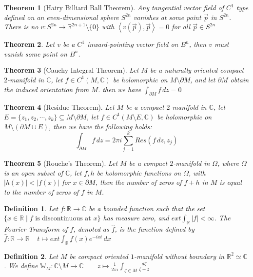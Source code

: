 \documentclass[9pt]{article}
\theoremstyle{break}
\theoremstyle{break}
\newtheorem{thm}{Theorem}[section]
\newtheorem{defn}{Definition}[corL]
\newcommand{\R}{\mathbb{R}}
\newcommand{\Complex}{\mathbb{C}}
\begin{document}
\begin{thm}[Hairy Billiard Ball Theorem]
Any tangential vector field of $C^1$ type defined on an even-dimensional sphere $S^{2n}$ vanishes at some point $\vec{p}$ in $S^{2n}$. There is no $v:S^{2n} \to \R^{2n+1}\setminus \{0\}$ with $\left<v(\vec{p}), \vec{p}\right> = 0$ for all $\vec{p}\in S^{2n}$
\end{thm}

\begin{thm}
Let $v$ be a $C^1$ inward-pointing vector field on $B^n$, then $v$ must vanish some point on $B^n$.
\end{thm}

\begin{thm}[Cauchy Integral Theorem]
Let $M$ be a naturally oriented compact $2$-manifold in $\Complex$, let $f \in C^1(M, \Complex)$ be holomorphic on $M \setminus \partial M$, and let $\partial M$ obtain the induced orientation from $M$. then we have $\int_{\partial M}f\, dz = 0$
\end{thm}


\begin{thm}[Residue Theorem]
Let $M$ be a compact $2$-manifold in $\Complex$, let $E = \{z_1,z_2,\cdots, z_k\} \subseteq M\setminus \partial M$, let $f\in C^1(M\setminus E, \Complex)$ be holomorphic on $M \setminus (\partial M\cup E)$, then we have the following holds:
$$\int_{\partial M}f\, dz = 2\pi i \sum_{j=1}^k Res(f\, dz, z_j)$$ 
\end{thm}


\begin{thm}[Rouche's Theorem]
Let $M$ be a compact $2$-manifold in $\Omega$, where $\Omega$ is an open subset of $\Complex$, let $f, h$ be holomorphic functions on $\Omega$, with $|h(x)|< |f(x)|$ for $x\in\partial M$, then the number of zeros of $f+h$ in $M$ is equal to the number of zeros of $f$ in $M$.  
\end{thm}

\begin{defn}
Let $f:\R \to \Complex$ be a bounded function such that the set $\{x \in \R \mid f\text{ is discontinuous at }x\}$ has measure zero, and $ext \int_{\R}|f| < \infty$. The Fourier Transform of $f$, denoted as $\hat{f}$, is the function defined by $
\hat{f}:\R \to \R \ \ \ \ \ t\mapsto ext\int_{\R}f(x) e^{-i xt}\, dx$
\end{defn}

\begin{defn}
Let $M$ be compact oriented $1$-manifold without boundary in $\R^2\simeq \Complex$. We define $
\mathbb{W}_M: \Complex\setminus M \to \Complex  \qquad z\mapsto \frac{1}{2\pi i}\int_{\zeta \in M} \frac{d\zeta}{\zeta -z}$
\end{defn}
\end{document}
